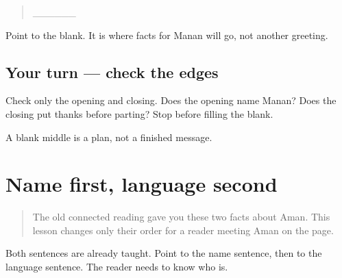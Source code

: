 \begin{quote}
\_\_\_\_\_\_
\end{quote}

\begin{quote}
  
\end{quote}

Point to the blank. It is where facts for Manan will go, not another greeting.

\subsection*{Your turn — check the edges}
Check only the opening and closing. Does the opening name Manan? Does the closing put thanks before parting? Stop before filling the blank.

\begin{tcolorbox}[breakable,colback=teal!4,colframe=teal!35!black,title={Before you move on}]
A blank middle is a plan, not a finished message.
\end{tcolorbox}
\section[\texorpdfstring{\pa{ਮੇਰਾ} \pa{ਨਾਂ} \pa{ਅਮਨ} \pa{ਹੈ।} … (merā nāṁ aman …)}{ਮੇਰਾ ਨਾਂ ਅਮਨ ਹੈ। … (merā nāṁ aman …)}]{Name first, language second}

\label{lesson:PA-W12-two-sentence-order}



\begin{quote}
The old connected reading gave you these two facts about Aman. This lesson changes only their order for a reader meeting Aman on the page.
\end{quote}

\begin{tcolorbox}[breakable,skin=enhanced,colback=orange!6,colframe=orange!45!black,boxrule=0.5pt,arc=1mm,left=6pt,right=6pt,top=4pt,bottom=4pt,fonttitle=\bfseries,title={Read this}]
\begin{quote}
   
\end{quote}

\begin{quote}
   
\end{quote}

Both sentences are already taught. Point to the name sentence, then to the language sentence. The reader needs to know who \textbf{} is.
\end{tcolorbox}

